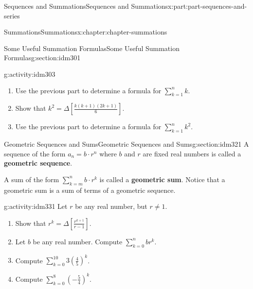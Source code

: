 \documentclass[oneside,10pt,]{book}
\newcommand{\terminology}[1]{\textbf{#1}}
\numberwithin{equation}{section}
\begin{document}
\begin{partptx}{Sequences and Summations}{}{Sequences and Summations}{}{}{x:part:part-sequences-and-series}
\begin{chapterptx}{Summations}{}{Summations}{}{}{x:chapter:chapter-summations}
\begin{sectionptx}{Some Useful Summation Formulas}{}{Some Useful Summation Formulas}{}{}{g:section:idm301}
\begin{activity}{}{g:activity:idm303}
\begin{enumerate}[font=\bfseries,label=(\alph*),ref=\alph*]
\item{}Use the previous part to determine a formula for \(\displaystyle\sum_{k=1}^n k\).%
\item{}Show that \(k^2 = \Delta \left[ \frac{k(k+1)(2k+1)}{6}\right]\).%
\item{}Use the previous part to determine a formula for \(\displaystyle\sum_{k=1}^n k^2\).%
\end{enumerate}
\end{activity}
\end{sectionptx}
%
%
\typeout{************************************************}
\typeout{************************************************}
%
\begin{sectionptx}{Geometric Sequences and Sums}{}{Geometric Sequences and Sums}{}{}{g:section:idm321}
A sequence of the form \(a_n = b\cdot r^n\) where \(b\) and \(r\) are fixed real numbers is called a \terminology{geometric sequence}.%
\par
A sum of the form \(\displaystyle\sum_{k=m}^n b\cdot r^k\) is called a \terminology{geometric sum}. Notice that a geometric sum is a sum of terms of a geometric sequence.%
\begin{activity}{}{g:activity:idm331}%
Let \(r\) be any real number, but \(r \neq 1\).%
\begin{enumerate}[font=\bfseries,label=(\alph*),ref=\alph*]
\item{}Show that \(\displaystyle r^k = \Delta \left[\frac{r^{k+1}}{r-1}\right]\).%
\item{}Let \(b\) be any real number. Compute \(\displaystyle\sum_{k=0}^n b r^k\).%
\item{}Compute \(\displaystyle\sum_{k=0}^{10} 3 \left(\frac{4}{5}\right)^k\).%
\item{}Compute \(\displaystyle\sum_{k=0}^8  \left(-\frac{5}{4}\right)^k\).%
\end{enumerate}
\end{activity}
\end{sectionptx}
\end{chapterptx}
\end{partptx}
%
%
\typeout{************************************************}
\typeout{************************************************}
%
\end{document}
